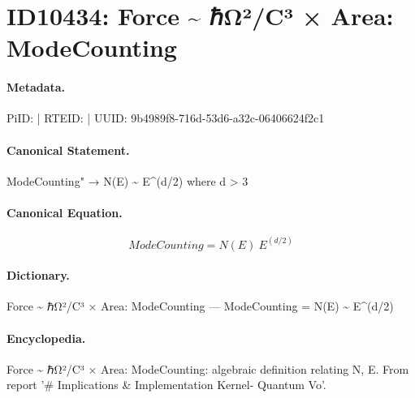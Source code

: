 \section*{ID10434: Force \textasciitilde{} ℏΩ²/C³ × Area: ModeCounting}
\paragraph{Metadata.}
PiID:  | RTEID:  | UUID: 9b4989f8-716d-53d6-a32c-06406624f2c1

\paragraph{Canonical Statement.}
ModeCounting" → N(E) \textasciitilde{} E\textasciicircum{}(d/2) where d > 3

\paragraph{Canonical Equation.}
\[
ModeCounting = N(E) ~ E^(d/2)
\]

\paragraph{Dictionary.}
Force \textasciitilde{} ℏΩ²/C³ × Area: ModeCounting — ModeCounting = N(E) \textasciitilde{} E\textasciicircum{}(d/2)

\paragraph{Encyclopedia.}
Force \textasciitilde{} ℏΩ²/C³ × Area: ModeCounting: algebraic definition relating N, E. From report '\# Implications \& Implementation Kernel- Quantum Vo'.
